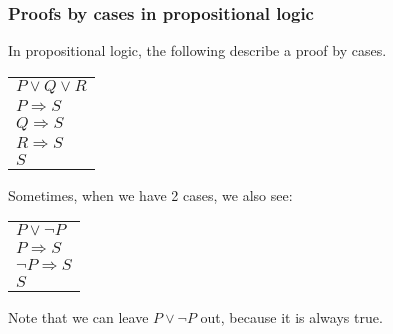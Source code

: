 \begin{frame}\frametitle{Proofs by cases in propositional logic}
  In propositional logic, the following describe a proof by cases.

  \begin{tcolorbox}
    \begin{tabular}{l}
      $P \vee Q \vee R$ \\
      $P\Rightarrow S$ \\
      $Q\Rightarrow S$ \\
      $R\Rightarrow S$ \\
      \hline
      $S$
    \end{tabular}
  \end{tcolorbox}
  \pause

  Sometimes, when we have 2 cases, we also see:
  \pause
  
  \begin{tcolorbox}
    \begin{tabular}{l}
      $P\vee\neg P$\\
      $P\Rightarrow S$ \\
      $\neg P \Rightarrow S$ \\
      \hline
      $S$
    \end{tabular}
  \end{tcolorbox}

  Note that we can leave $P\vee\neg P$ out, because it is always true.
\end{frame}
